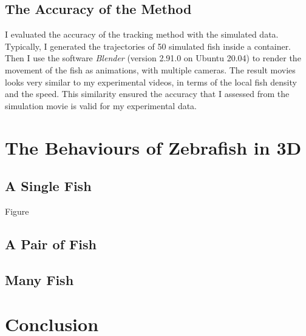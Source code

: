 \documentclass[11pt,twoside]{report}
\begin{document}
\subsection{The Accuracy of the Method}

I evaluated the accuracy of the tracking method with the simulated data. Typically, I generated the trajectories of 50 simulated fish inside a container. Then I use the software \emph{Blender} (version 2.91.0 on Ubuntu 20.04) to render the movement of the fish as animations, with multiple cameras. The result movies looks very similar to my experimental videos, in terms of the local fish density and the speed. This similarity ensured the accuracy that I assessed from the simulation movie is valid for my experimental data.


\section{The Behaviours of Zebrafish in 3D}

\subsection{A Single Fish}

Figure



\subsection{A Pair of Fish}

\subsection{Many Fish}

\section{Conclusion}

\printbibliography
\end{document}
